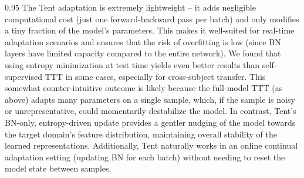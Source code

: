 \documentclass{article} %
\begin{document}
\begin{spacing}{0.95}
The Tent adaptation is extremely lightweight – it adds negligible computational cost (just one forward-backward pass per batch) and only modifies a tiny fraction of the model’s parameters. This makes it well-suited for real-time adaptation scenarios and ensures that the risk of overfitting is low (since BN layers have limited capacity compared to the entire network). We found that using entropy minimization at test time yields even better results than self-supervised TTT in some cases, especially for cross-subject transfer. This somewhat counter-intuitive outcome is likely because the full-model TTT (as above) adapts many parameters on a single sample, which, if the sample is noisy or unrepresentative, could momentarily destabilize the model. In contrast, Tent’s BN-only, entropy-driven update provides a gentler nudging of the model towards the target domain’s feature distribution, maintaining overall stability of the learned representations. Additionally, Tent naturally works in an online continual adaptation setting (updating BN for each batch) without needing to reset the model state between samples.

\end{spacing}


\end{document}
